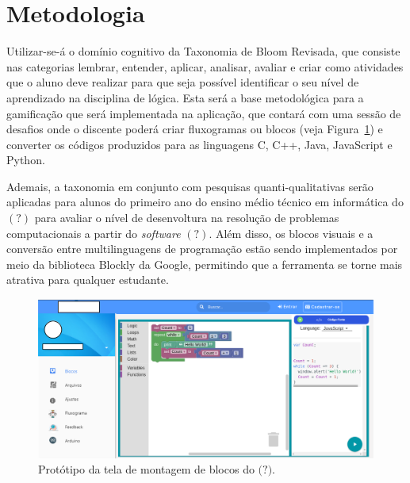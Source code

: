 \documentclass[12pt]{article}
\begin{document}
\section{Metodologia} 
Utilizar-se-á o domínio cognitivo da Taxonomia de Bloom Revisada, que consiste nas categorias lembrar, entender, aplicar, analisar, avaliar e criar \cite{ANDERSON:2001} como atividades que o aluno deve realizar para que seja possível identificar o seu nível de aprendizado na disciplina de lógica. Esta será a base metodológica para a gamificação que será implementada na aplicação, que contará com uma sessão de desafios onde o discente poderá criar fluxogramas ou blocos (veja Figura~\ref{fig2}) e converter os códigos produzidos para as linguagens C, C++, Java, JavaScript e Python.
\par Ademais, a taxonomia em conjunto com pesquisas quanti-qualitativas serão aplicadas para alunos do primeiro ano do ensino médio técnico em informática do $(?)$ para avaliar o nível de desenvoltura na resolução de problemas computacionais a partir do \textit{software} $(?)$.
Além disso, os blocos visuais e a conversão entre multilinguagens de programação estão sendo implementados por meio da biblioteca Blockly da Google, permitindo que a ferramenta se torne mais atrativa para qualquer estudante.  

	\begin{figure}[h]
		\centering
		\includegraphics[scale=0.3]{bloc.png}
		\caption{Protótipo da tela de montagem de blocos do $\textbf{(?)}$.}
		\label{fig2}
	\end{figure}
\end{document}
